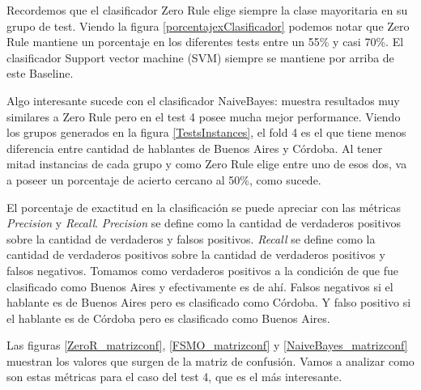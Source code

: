 Recordemos que el clasificador Zero Rule elige siempre la clase mayoritaria en su grupo de test. Viendo la figura \ref{porcentajexClasificador} podemos notar que Zero Rule mantiene un porcentaje en los diferentes tests entre un 55\% y casi 70\%. El clasificador Support vector machine (SVM) siempre se mantiene por arriba de este Baseline.

Algo interesante sucede con el clasificador NaiveBayes: muestra resultados muy similares a Zero Rule pero en el test 4 posee mucha mejor performance. Viendo los grupos generados en la figura \ref{TestsInstances}, el fold 4 es el que tiene menos diferencia entre cantidad de hablantes de Buenos Aires y Córdoba. Al tener mitad instancias de cada grupo y como Zero Rule elige entre uno de esos dos, va a poseer un porcentaje de acierto cercano al 50\%, como sucede.  

El porcentaje de exactitud en la clasificación se puede apreciar con las métricas \textit{Precision} y \textit{Recall}. \textit{Precision} se define como la cantidad de verdaderos positivos sobre la cantidad de verdaderos y falsos positivos. \textit{Recall} se define como la cantidad de verdaderos positivos sobre la cantidad de verdaderos positivos y falsos negativos. Tomamos como verdaderos positivos a la condición de que fue clasificado como Buenos Aires y efectivamente es de ahí. Falsos negativos si el hablante es de Buenos Aires pero es clasificado como Córdoba. Y falso positivo si el hablante es de Córdoba pero es clasificado como Buenos Aires. 


Las figuras \ref{ZeroR_matrizconf}, \ref{FSMO_matrizconf} y \ref{NaiveBayes_matrizconf} muestran los valores que  surgen de la matriz de confusión. Vamos a analizar como son estas métricas para el caso del test 4, que es el más interesante.



